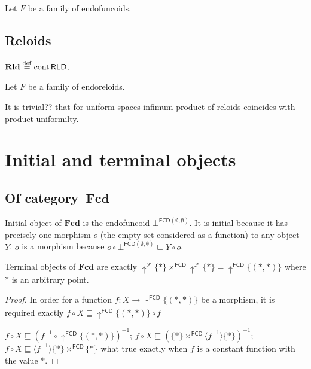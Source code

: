 Let $F$ be a family of endofuncoids.

\subsection{Reloids}

\begin{defn}
  $\mathbf{Rld} \overset{\mathrm{def}}{=} \operatorname{cont} \mathsf{RLD}$.
\end{defn}

Let $F$ be a family of endoreloids.

It is trivial?? that for uniform spaces infimum product of reloids coincides
with product uniformilty.

\section{Initial and terminal objects}

\subsection{Of category~$\mathbf{Fcd}$}

Initial object of $\mathbf{Fcd}$ is the endofuncoid
$\bot^{\mathsf{FCD} (\emptyset , \emptyset)}$. It is
initial because it has precisely one morphism $o$ (the empty set considered as
a function) to any object $Y$. $o$ is a morphism because $o \circ
\bot^{\mathsf{FCD} (\emptyset , \emptyset)} \sqsubseteq Y
\circ o$.

\begin{prop}
  Terminal objects of $\mathbf{Fcd}$ are exactly
  $\uparrow^{\mathscr{F}} \{ \ast \} \times^{\mathsf{FCD}}
  \uparrow^{\mathscr{F}} \{ \ast \} = \uparrow^{\mathsf{FCD}} \{ (\ast
  , \ast) \}$ where $\ast$ is an arbitrary point.
\end{prop}

\begin{proof}
  In order for a function $f : X \rightarrow \uparrow^{\mathsf{FCD}} \{
  (\ast , \ast) \}$ be a morphism, it is required exactly $f \circ X
  \sqsubseteq \uparrow^{\mathsf{FCD}} \{ (\ast , \ast) \} \circ f$
  
  $f \circ X \sqsubseteq (f^{- 1} \circ \uparrow^{\mathsf{FCD}} \{
  (\ast , \ast) \})^{- 1}$; $f \circ X \sqsubseteq (\{ \ast \}
  \times^{\mathsf{FCD}} \langle f^{- 1} \rangle \{ \ast \})^{- 1}$; $f
  \circ X \sqsubseteq \langle f^{- 1} \rangle \{ \ast \}
  \times^{\mathsf{FCD}} \{ \ast \}$ what true exactly when $f$ is a
  constant function with the value $\ast$.
\end{proof}

